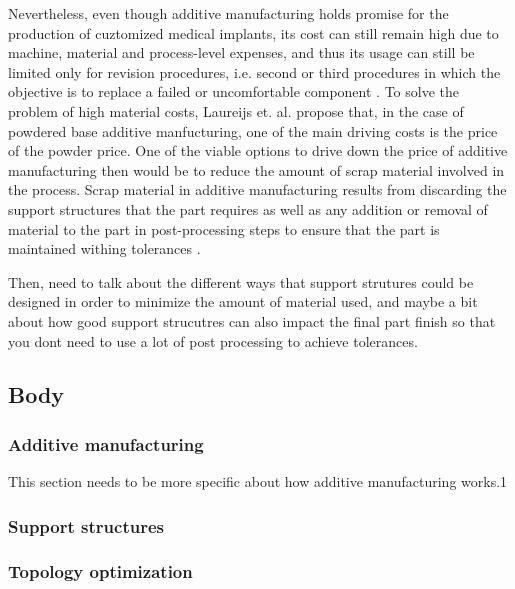 \documentclass[../main.tex]{subfiles}
\begin{document}
Nevertheless, even though additive manufacturing holds promise for the production of cuztomized medical implants, its cost can still remain high due to machine, material and process-level expenses, and thus its usage can still be limited only for revision procedures, i.e. second or third procedures in which the objective is to replace a failed or uncomfortable component \cite{narraAdditiveManufacturingTotal2019}. To solve the problem of high material costs, Laureijs et. al. propose that, in the case of powdered base additive manfucturing, one of the main driving costs is the price of the powder price. One of the viable options to drive down the price of additive manufacturing then would be to reduce the amount of scrap material involved in the process. Scrap material in additive manufacturing results from discarding the support structures that the part requires as well as any addition or removal of material to the part in post-processing steps to ensure that the part is maintained withing tolerances \cite{MetalAdditiveManufacturing}.

Then, need to talk about the different ways that support strutures could be designed in order to minimize the amount of material used, and maybe a bit about how good support strucutres can also impact the final part finish so that you dont need to use a lot of post processing to achieve tolerances.

\subsection{Body}

\subsubsection{Additive manufacturing}

This section needs to be more specific about how additive manufacturing works.1

\subsubsection{Support structures}

\subsubsection{Topology optimization}
\end{document}
